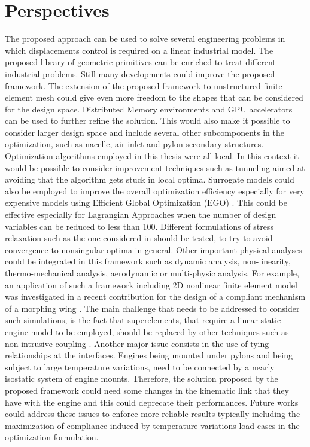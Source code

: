 \section{Perspectives}
The proposed approach can be used to solve several engineering problems in which displacements control is required on a linear industrial model. The proposed library of geometric primitives can be enriched to treat different industrial problems. Still many developments could improve the proposed framework. 
The extension of the proposed framework to unstructured finite element mesh could give even more freedom to the shapes that can be considered for the design space.
Distributed Memory environments and GPU accelerators can be used to further refine the solution. This would also make it possible to consider larger design space and include several other subcomponents in the optimization, such as nacelle, air inlet and pylon secondary structures.
Optimization algorithms employed in this thesis were all local. In this context  it would be possible to consider improvement techniques such as tunneling \cite{zhang2018finding} aimed at avoiding that the algorithm gets stuck in local optima.
Surrogate models could also be employed to improve the overall optimization efficiency especially for very expensive models using Efficient Global Optimization (EGO) \cite{bouhlel2018efficient}. This could be effective especially for Lagrangian Approaches when the number of design variables can be reduced to less than 100.
Different formulations of stress relaxation such as the one considered in \cite{zhang2017stress} should be tested, to try to avoid convergence to nonsingular optima in general.
Other important physical analyses could be integrated in this framework such as dynamic analysis, non-linearity, thermo-mechanical analysis, aerodynamic or multi-physic analysis. For example, an application of such a framework including 2D nonlinear finite element model was investigated in a recent contribution for the design of a compliant mechanism of a morphing wing \cite{capasso2019optimisation}.
The main challenge that needs to be addressed to consider such simulations, is the fact that superelements, that require a linear static engine model to be employed, should be replaced by other techniques such as non-intrusive coupling \cite{Gendre2009}. Another major issue consists in the use of tying relationships at the interfaces. Engines being mounted under pylons and being subject to large temperature variations, need to be connected by a nearly isostatic system of engine mounts. Therefore, the solution proposed by the proposed framework could need some changes in the kinematic link that they have with the engine and this could deprecate their performances. Future works could address these issues to enforce more reliable results typically including the maximization of compliance induced by temperature variations load cases in the optimization formulation. 
